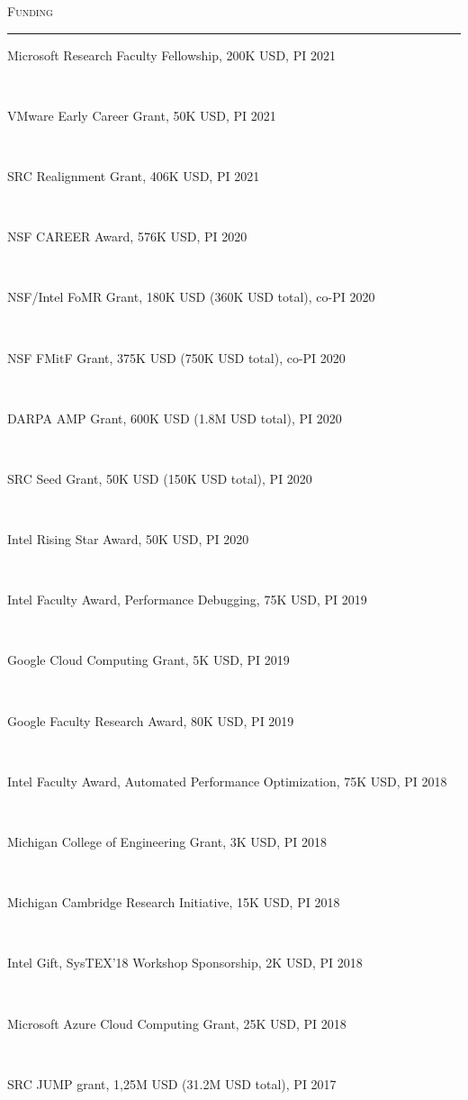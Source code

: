\documentclass[10pt]{article}
\newcommand{\mysec}[1]{\vspace{2em}\textsc{\large #1}\vspace{1mm}\hrule\vspace{2mm}}
\newcommand{\myssub}[1]{\hspace*{2mm}\parbox{163mm}{#1}\vspace*{2mm}}
\begin{document}

\newpage

\mysec{Funding}

\myssub{Microsoft Research Faculty Fellowship, 200K USD, PI \hfill 2021} \\
\myssub{VMware Early Career Grant, 50K USD, PI \hfill 2021} \\
\myssub{SRC Realignment Grant, 406K USD, PI \hfill 2021} \\
\myssub{NSF CAREER Award, 576K USD, PI \hfill 2020} \\
\myssub{NSF/Intel FoMR Grant, 180K USD (360K USD total), co-PI \hfill 2020} \\
\myssub{NSF FMitF Grant, 375K USD (750K USD total), co-PI \hfill 2020} \\
\myssub{DARPA AMP Grant, 600K USD (1.8M USD total), PI \hfill 2020} \\
\myssub{SRC Seed Grant, 50K USD (150K USD total), PI \hfill 2020} \\
\myssub{Intel Rising Star Award, 50K USD, PI \hfill 2020} \\
\myssub{Intel Faculty Award, Performance Debugging, 75K USD, PI \hfill 2019} \\
\myssub{Google Cloud Computing Grant, 5K USD, PI \hfill 2019} \\
\myssub{Google Faculty Research Award, 80K USD, PI \hfill 2019} \\
\myssub{Intel Faculty Award, Automated Performance Optimization, 75K USD, PI \hfill 2018} \\
\myssub{Michigan College of Engineering Grant, 3K USD, PI \hfill 2018} \\
\myssub{Michigan Cambridge Research Initiative, 15K USD, PI \hfill 2018} \\
\myssub{Intel Gift, SysTEX'18 Workshop Sponsorship, 2K USD, PI \hfill 2018} \\
\myssub{Microsoft Azure Cloud Computing Grant, 25K USD, PI \hfill 2018} \\
\myssub{SRC JUMP grant, 1,25M USD (31.2M USD total), PI \hfill 2017} \\
\end{document}
